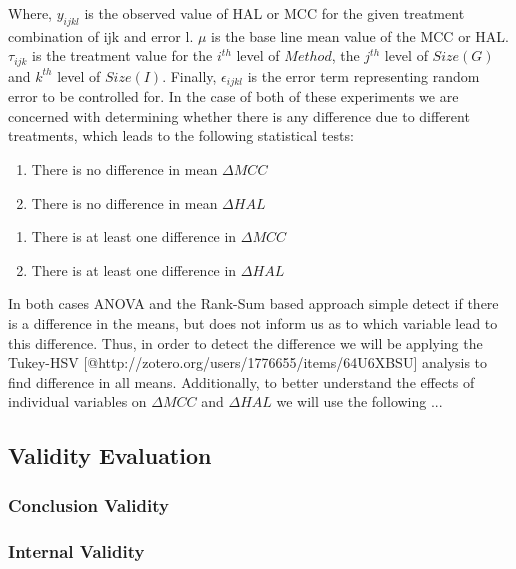 \documentclass[10pt,nocc]{xrese_report}
\begin{document}
\noindent Where, $y_{ijkl}$ is the observed value of HAL or MCC for the given treatment combination of {ijk} and error {l}. $\mu$ is the base line mean value of the MCC or HAL. $\tau_{ijk}$ is the treatment value for the $i^{th}$ level of $Method$, the $j^{th}$ level of $Size(G)$ and $k^{th}$ level of $Size(I)$. Finally, $\epsilon_{ijkl}$ is the error term representing random error to be controlled for. In the case of both of these experiments we are concerned with determining whether there is any difference due to different treatments, which leads to the following statistical tests:

\begin{enumerate}[left=1em,label=H\textsubscript{\arabic*,0} :]
 \item There is no difference in mean $\Delta MCC$
 \item There is no difference in mean $\Delta HAL$
\end{enumerate}

\begin{enumerate}[left=1em,label=H\textsubscript{\arabic*,A} :]
 \item There is at least one difference in $\Delta MCC$
 \item There is at least one difference in $\Delta HAL$
\end{enumerate}

\noindent In both cases ANOVA and the Rank-Sum based approach simple detect if there is a difference in the means, but does not inform us as to which variable lead to this difference. Thus, in order to detect the difference we will be applying the Tukey-HSV [@http://zotero.org/users/1776655/items/64U6XBSU] analysis to find difference in all means. Additionally, to better understand the effects of individual variables on $\Delta MCC$ and $\Delta HAL$ we will use the following ...

\subsection{Validity Evaluation}

\subsubsection*{Conclusion Validity}

\subsubsection*{Internal Validity}
\end{document}
